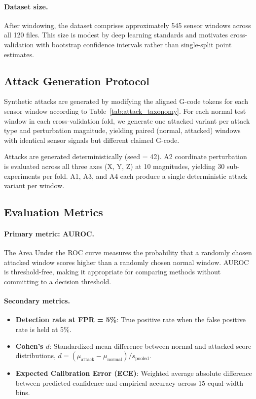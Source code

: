 \paragraph{Dataset size.}
After windowing, the dataset comprises approximately 545 sensor windows across all 120 files.
This size is modest by deep learning standards and motivates cross-validation with bootstrap confidence intervals rather than single-split point estimates.

\subsection{Attack Generation Protocol}
\label{sec:attack_generation}

Synthetic attacks are generated by modifying the aligned G-code tokens for each sensor window according to Table~\ref{tab:attack_taxonomy}.
For each normal test window in each cross-validation fold, we generate one attacked variant per attack type and perturbation magnitude, yielding paired (normal, attacked) windows with identical sensor signals but different claimed G-code.

Attacks are generated deterministically (seed = 42).
A2 coordinate perturbation is evaluated across all three axes (X, Y, Z) at 10 magnitudes, yielding 30 sub-experiments per fold.
A1, A3, and A4 each produce a single deterministic attack variant per window.

\subsection{Evaluation Metrics}
\label{sec:metrics}

\paragraph{Primary metric: AUROC.}
The Area Under the ROC curve measures the probability that a randomly chosen attacked window scores higher than a randomly chosen normal window.
AUROC is threshold-free, making it appropriate for comparing methods without committing to a decision threshold.

\paragraph{Secondary metrics.}
\begin{itemize}
    \item \textbf{Detection rate at FPR = 5\%}: True positive rate when the false positive rate is held at 5\%.
    \item \textbf{Cohen's $d$}: Standardized mean difference between normal and attacked score distributions, $d = (\mu_{\text{attack}} - \mu_{\text{normal}}) / s_{\text{pooled}}$.
    \item \textbf{Expected Calibration Error (ECE)}: Weighted average absolute difference between predicted confidence and empirical accuracy across 15 equal-width bins.
\end{itemize}

